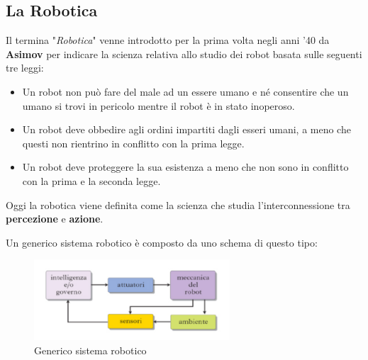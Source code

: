 \documentclass[a4paper,12pt,italian]{article}
\begin{document}
\subsection{La Robotica}
Il termina "\textit{Robotica}" venne introdotto per la prima volta negli anni '40 da \textbf{Asimov} per indicare la scienza relativa allo studio dei robot basata sulle seguenti tre leggi:
\begin{itemize}
	\item Un robot non può fare del male ad un essere umano e né consentire che un umano si trovi in pericolo mentre il robot è in stato inoperoso.
	\item Un robot deve obbedire agli ordini impartiti dagli esseri umani, a meno che questi non rientrino in conflitto con la prima legge. 
	\item Un robot deve proteggere la sua esistenza a meno che non sono in conflitto con la prima e la seconda legge. 
\end{itemize}

Oggi la robotica viene definita come la scienza che studia l’interconnessione tra \textbf{percezione} e \textbf{azione}.

Un generico sistema robotico è composto da uno schema di questo tipo:
 
\begin{figure}[H]
\begin{center}
\includegraphics[width=0.65\textwidth]{robotica}
\caption{Generico sistema robotico}
\end{center}
\end{figure}
\end{document}
